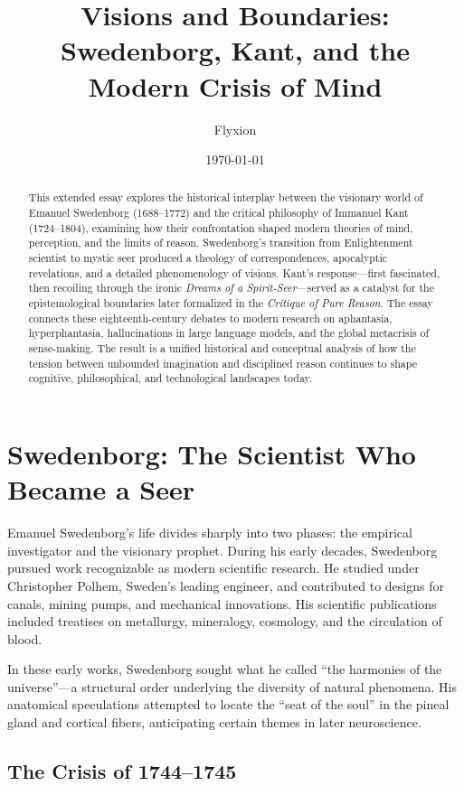 \documentclass[12pt]{article}
\title{Visions and Boundaries: Swedenborg, Kant, and the Modern Crisis of Mind}
\author{Flyxion}
\date{\today}
\begin{document}
\maketitle

\begin{abstract}
This extended essay explores the historical interplay between the visionary 
world of Emanuel Swedenborg (1688--1772) and the critical philosophy of 
Immanuel Kant (1724--1804), examining how their confrontation shaped modern 
theories of mind, perception, and the limits of reason. Swedenborg's transition 
from Enlightenment scientist to mystic seer produced a theology of 
correspondences, apocalyptic revelations, and a detailed phenomenology of 
visions. Kant's response---first fascinated, then recoiling through the ironic 
\emph{Dreams of a Spirit-Seer}---served as a catalyst for the epistemological 
boundaries later formalized in the \emph{Critique of Pure Reason}. The essay 
connects these eighteenth-century debates to modern research on aphantasia, 
hyperphantasia, hallucinations in large language models, and the global 
metacrisis of sense-making. The result is a unified historical and conceptual 
analysis of how the tension between unbounded imagination and disciplined 
reason continues to shape cognitive, philosophical, and technological 
landscapes today.
\end{abstract}

\section{Swedenborg: The Scientist Who Became a Seer}

Emanuel Swedenborg's life divides sharply into two phases: the empirical 
investigator and the visionary prophet. During his early decades, Swedenborg 
pursued work recognizable as modern scientific research. He studied under 
Christopher Polhem, Sweden's leading engineer, and contributed to designs for 
canals, mining pumps, and mechanical innovations. His scientific publications 
included treatises on metallurgy, mineralogy, cosmology, and the circulation 
of blood.

In these early works, Swedenborg sought what he called ``the harmonies of the 
universe''---a structural order underlying the diversity of natural 
phenomena. His anatomical speculations attempted to locate the ``seat of the 
soul'' in the pineal gland and cortical fibers, anticipating certain themes 
in later neuroscience.

\subsection{The Crisis of 1744--1745}
\end{document}
